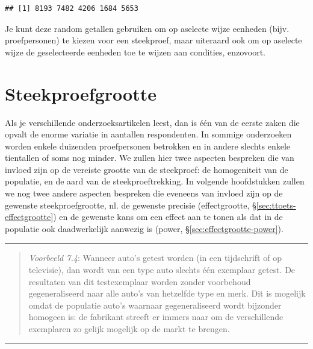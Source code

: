 \documentclass[
]{book}
\begin{document}
\begin{verbatim}
## [1] 8193 7482 4206 1684 5653
\end{verbatim}

Je kunt deze random getallen gebruiken om op aselecte wijze eenheden (bijv. proefpersonen) te kiezen voor een steekproef, maar uiteraard ook om op aselecte wijze de geselecteerde eenheden toe te wijzen aan condities, enzovoort.

\hypertarget{sec:steekproefgrootte}{%
\section{Steekproefgrootte}\label{sec:steekproefgrootte}}

Als je verschillende onderzoeksartikelen leest, dan is één van de eerste
zaken die opvalt de enorme variatie in aantallen respondenten. In
sommige onderzoeken worden enkele duizenden proefpersonen betrokken en
in andere slechts enkele tientallen of soms nog minder. We zullen hier
twee aspecten bespreken die van invloed zijn op de vereiste grootte van
de steekproef: de homogeniteit van de populatie, en de aard van de
steekproeftrekking. In volgende hoofdstukken zullen we nog twee andere
aspecten bespreken die eveneens van invloed zijn op de gewenste
steekproefgrootte, nl. de gewenste precisie (effectgrootte,
§\ref{sec:ttoets-effectgrootte}) en de gewenste kans om een effect
aan te tonen als dat in de populatie ook daadwerkelijk aanwezig is
(power,
§\ref{sec:effectgrootte-power}).

\begin{center}\rule{0.5\linewidth}{0.5pt}\end{center}

\begin{quote}
\emph{Voorbeeld 7.4}: Wanneer auto's getest worden (in een
tijdschrift of op televisie), dan wordt van een type auto slechts één
exemplaar getest. De resultaten van dit testexemplaar worden zonder
voorbehoud gegeneraliseerd naar alle auto's van hetzelfde type en merk.
Dit is mogelijk omdat de populatie auto's waarnaar gegeneraliseerd wordt
bijzonder homogeen is: de fabrikant streeft er immers naar om de
verschillende exemplaren zo gelijk mogelijk op de markt te brengen.
\end{quote}

\begin{center}\rule{0.5\linewidth}{0.5pt}\end{center}
\end{document}
